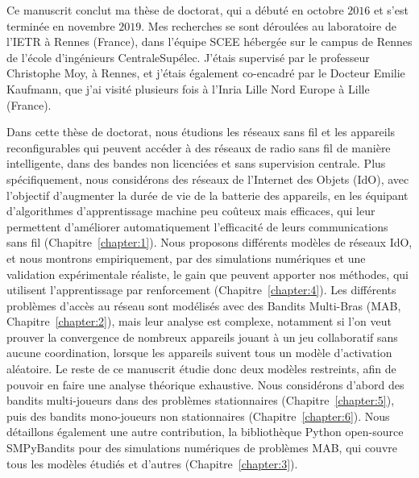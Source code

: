 \begin{resume_fr}



Ce manuscrit conclut ma thèse de doctorat, qui a débuté en octobre $2016$ et s'est terminée en novembre $2019$.
Mes recherches se sont déroulées au laboratoire de l'IETR à Rennes (France), dans l'équipe SCEE hébergée sur le campus de Rennes de l'école d'ingénieurs CentraleSupélec.
J'étais supervisé par le professeur Christophe Moy, à Rennes,
et j'étais également co-encadré par le Docteur Emilie Kaufmann, que j'ai visité plusieurs fois à l'Inria Lille Nord Europe à Lille (France).


Dans cette thèse de doctorat, nous étudions les réseaux sans fil et les appareils reconfigurables qui peuvent accéder à des réseaux de radio sans fil de manière intelligente, dans des bandes non licenciées et sans supervision centrale.
Plus spécifiquement, nous considérons des réseaux de l'Internet des Objets (IdO), avec l'objectif d'augmenter la durée de vie de la batterie des appareils, en les équipant d'algorithmes d'apprentissage machine peu coûteux mais efficaces, qui leur permettent d'améliorer automatiquement l'efficacité de leurs communications sans fil (Chapitre~\ref{chapter:1}).
Nous proposons différents modèles de réseaux IdO, et nous montrons empiriquement, par des simulations numériques et une validation expérimentale réaliste, le gain que peuvent apporter nos méthodes, qui utilisent l'apprentissage par renforcement (Chapitre~\ref{chapter:4}).
Les différents problèmes d'accès au réseau sont modélisés avec des Bandits Multi-Bras (MAB, Chapitre~\ref{chapter:2}), mais leur analyse est complexe,
notamment si l'on veut prouver la convergence de nombreux appareils jouant à un jeu collaboratif sans aucune coordination, lorsque les appareils suivent tous un modèle d'activation aléatoire.
Le reste de ce manuscrit étudie donc deux modèles restreints, afin de pouvoir en faire une analyse théorique exhaustive.
Nous considérons d'abord des bandits multi-joueurs dans des problèmes stationnaires (Chapitre~\ref{chapter:5}), puis des bandits mono-joueurs non stationnaires (Chapitre~\ref{chapter:6}).
Nous détaillons également une autre contribution, la bibliothèque Python open-source SMPyBandits pour des simulations numériques de problèmes MAB, qui couvre tous les modèles étudiés et d'autres (Chapitre~\ref{chapter:3}).



\end{resume_fr}
